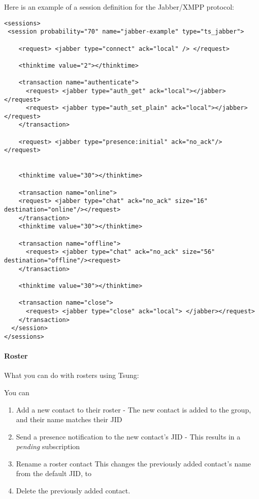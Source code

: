 \documentclass{IDXDOC-en}
\begin{document}
\label{sec:sessions:jabber}
\par Here is an example of a session definition for the Jabber/XMPP protocol:
\begin{Verbatim}
<sessions>
 <session probability="70" name="jabber-example" type="ts_jabber">

    <request> <jabber type="connect" ack="local" /> </request>

    <thinktime value="2"></thinktime>

    <transaction name="authenticate">
      <request> <jabber type="auth_get" ack="local"></jabber> </request>
      <request> <jabber type="auth_set_plain" ack="local"></jabber> </request>
    </transaction>

    <request> <jabber type="presence:initial" ack="no_ack"/> </request>


    <thinktime value="30"></thinktime>

    <transaction name="online">
    <request> <jabber type="chat" ack="no_ack" size="16" destination="online"/></request>
    </transaction>
    <thinktime value="30"></thinktime>

    <transaction name="offline">
      <request> <jabber type="chat" ack="no_ack" size="56" destination="offline"/><request>
    </transaction>

    <thinktime value="30"></thinktime>

    <transaction name="close">
      <request> <jabber type="close" ack="local"> </jabber></request>
    </transaction>
  </session>
</sessions>
\end{Verbatim}

\paragraph{Roster}

What you can do with rosters using Tsung:

You can
\begin{enumerate}
\item  Add a new contact to their roster
   - The new contact is added to the  group, and their name matches their JID
\item  Send a  presence notification to the new contact's JID
   - This results in a \emph{pending} subscription
 \item  Rename a roster contact
    This changes the previously added contact's name from the default JID, to 
  \item Delete the previously added contact.
\end{enumerate}
\end{document}
